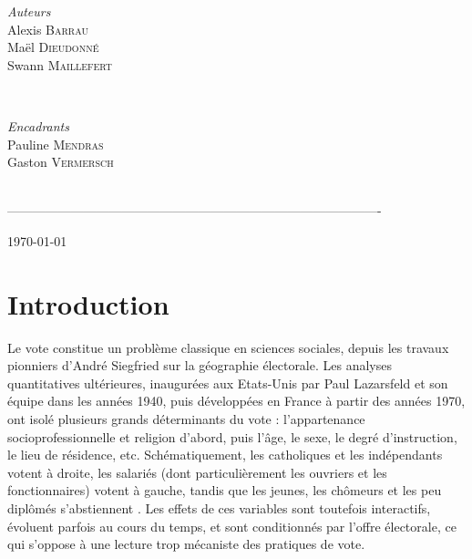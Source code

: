 \documentclass[12pt]{article}
\begin{document}
\begin{titlepage}
\begin{minipage}{0.4\textwidth}
\begin{flushleft} \large
\emph{Auteurs}\\
Alexis \textsc{Barrau}\\
Maël \textsc{Dieudonné}\\
Swann \textsc{Maillefert}\\
\end{flushleft}
\end{minipage}\\[1cm]

\begin{minipage}{0.4\textwidth}
\begin{flushleft} \large
\emph{Encadrants}\\
Pauline \textsc{Mendras}\\
Gaston \textsc{Vermersch}\\
\end{flushleft}
\end{minipage}\\[1cm]

----------------------------------------------------------------------------------------

{\large \today}\\[2cm]
\vfill

\end{titlepage}

\section{Introduction}

Le vote constitue un problème classique en sciences sociales, depuis les travaux pionniers d’André Siegfried sur la géographie électorale. Les analyses quantitatives ultérieures, inaugurées aux Etats-Unis par Paul Lazarsfeld et son équipe dans les années 1940, puis développées en France à partir des années 1970, ont isolé plusieurs grands déterminants du vote : l’appartenance socioprofessionnelle et religion d’abord, puis l’âge, le sexe, le degré d’instruction, le lieu de résidence, etc. Schématiquement, les catholiques et les indépendants votent à droite, les salariés (dont particulièrement les ouvriers et les fonctionnaires) votent à gauche, tandis que les jeunes, les chômeurs et les peu diplômés s’abstiennent \cite{douillet_sociologie_2023}. Les effets de ces variables sont toutefois interactifs, évoluent parfois au cours du temps, et sont conditionnés par l’offre électorale, ce qui s’oppose à une lecture trop mécaniste des pratiques de vote.
\end{document}
